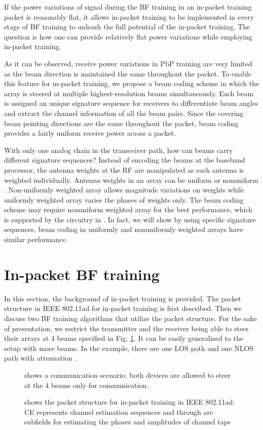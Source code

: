 \documentclass[10pt,conference]{IEEEtran}
\begin{document}
If the power variations of signal during the BF training in an in-packet training packet is reasonably flat, it allows in-packet training to be implemented in every stage of BF training to unleash the full potential of the in-packet training. The question is how one can provide relatively flat power variations while employing in-packet training.

As it can be observed, receive power variations in PbP training are very limited as the beam direction is maintained the same throughout the packet. To enable this feature for in-packet training, we propose a beam coding scheme in which the array is steered at multiple highest-resolution beams simultaneously. Each beam is assigned an unique signature sequence for receivers to differentiate beam angles and extract the channel
information of all the beam pairs. Since the
covering beam pointing directions are the same throughout the packet, beam coding provides a fairly uniform receive power across a packet.

With only one analog chain in the transceiver path, how can beams carry different signature sequences? Instead of encoding the beams at the baseband processor, the antenna weights at the RF are manipulated as each antenna is weighted individually. Antenna weights in an array can be uniform or nonuniform \cite{balanisBook}\cite{treesBook}. Non-uniformly weighted array allows magnitude variations on weights while uniformly weighted array varies the phases of weights only. The beam coding scheme may require nonuniform weighted array for the best performance, which is supported by the
circuitry in \cite{tsang10}. In fact, we will show by using specific signature sequences, beam coding in uniformly and nonuniformly weighted arrays have similar performance.

\section{In-packet BF training}
In this section, the background of in-packet training is provided. The packet structure in IEEE 802.11ad for in-packet training is first described. Then we discuss two BF training algorithms that utilize the packet structure. For the sake of presentation, we restrict the transmitter and the receiver being able to steer their arrays at 4 beams specified in Fig. \ref{fig:toy}. It can be easily generalized to the setup with more beams. In the example, there are one LOS path and one NLOS path with attenuation .

\begin{figure}
\centering
{}
\caption{shows a communication scenario: both devices are allowed
to steer at the 4 beams only for communication.}\label{fig:toy}
\end{figure}
\begin{figure}
\centering
{}
\caption{shows the packet structure for in-packet training in IEEE 802.11ad: CE represents channel estimation sequences and  through  are subfields for estimating the phases and amplitudes of channel taps}\label{fig:struc80211ad}
\end{figure}
\end{document}
